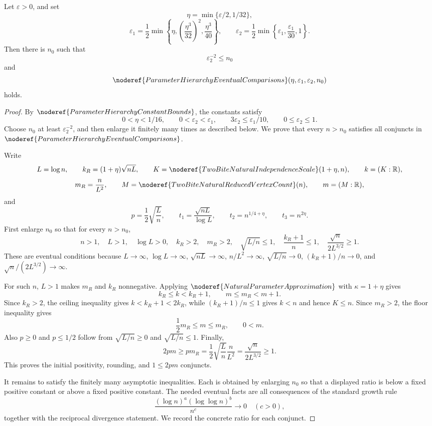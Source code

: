 \begin{lemma}
Let \(\varepsilon>0\), and set
\[
\eta=\min\{\varepsilon/2,1/32\},
\]
\[
\varepsilon_1=
\frac12\min\left\{
\eta,\left(\frac{\eta^3}{32}\right)^2,\frac{\eta^3}{40}
\right\},
\qquad
\varepsilon_2=\frac12\min\left\{\varepsilon_1,\frac{\varepsilon_1}{30},1\right\}.
\]
Then there is \(n_0\) such that
\[
\varepsilon_2^{-2}\le n_0
\]
and
\[
\noderef{ParameterHierarchyEventualComparisons}(\eta,\varepsilon_1,
\varepsilon_2,n_0)
\]
holds.
\end{lemma}
\begin{proof}
By \(\noderef{ParameterHierarchyConstantBounds}\), the constants satisfy
\[
0<\eta<1/16,\qquad 0<\varepsilon_2<\varepsilon_1,\qquad
3\varepsilon_2\le\varepsilon_1/10,\qquad 0\le\varepsilon_2\le1.
\]
Choose \(n_0\) at least \(\varepsilon_2^{-2}\), and then enlarge it finitely
many times as described below.  We prove that every \(n>n_0\) satisfies all
conjuncts in \(\noderef{ParameterHierarchyEventualComparisons}\).

Write
\[
L=\log n,\qquad
k_R=(1+\eta)\sqrt{nL},\qquad
K=\noderef{TwoBiteNaturalIndependenceScale}(1+\eta,n),\qquad
k=(K:\mathbb R),
\]
\[
m_R=\frac{n}{L^2},\qquad
M=\noderef{TwoBiteNaturalReducedVertexCount}(n),\qquad
m=(M:\mathbb R),
\]
and
\[
p=\frac12\sqrt{\frac Ln},\qquad
t_1=\frac{\sqrt{nL}}{\log L},\qquad
t_2=n^{1/4+\eta},\qquad
t_3=n^{2\eta}.
\]
First enlarge \(n_0\) so that for every \(n>n_0\),
\[
n>1,\quad L>1,\quad \log L>0,\quad k_R>2,\quad m_R>2,\quad
\sqrt{L/n}\le1,\quad \frac{k_R+1}{n}\le1,\quad
\frac{\sqrt n}{2L^{3/2}}\ge1.
\]
These are eventual conditions because \(L\to\infty\), \(\log L\to\infty\),
\(\sqrt{nL}\to\infty\), \(n/L^2\to\infty\), \(\sqrt{L/n}\to0\),
\((k_R+1)/n\to0\), and \(\sqrt n/(2L^{3/2})\to\infty\).

For such \(n\), \(L>1\) makes \(m_R\) and \(k_R\) nonnegative.  Applying
\(\noderef{NaturalParameterApproximation}\) with \(\kappa=1+\eta\) gives
\[
k_R\le k<k_R+1,\qquad m\le m_R<m+1.
\]
Since \(k_R>2\), the ceiling inequality gives \(k<k_R+1<2k_R\), while
\((k_R+1)/n\le1\) gives \(k<n\) and hence \(K\le n\).  Since \(m_R>2\), the
floor inequality gives
\[
\frac12m_R\le m\le m_R,\qquad 0<m.
\]
Also \(p\ge0\) and \(p\le1/2\) follow from \(\sqrt{L/n}\ge0\) and
\(\sqrt{L/n}\le1\).  Finally,
\[
2pm\ge p m_R
=\frac12\sqrt{\frac Ln}\frac{n}{L^2}
=\frac{\sqrt n}{2L^{3/2}}\ge1.
\]
This proves the initial positivity, rounding, and \(1\le2pm\) conjuncts.

It remains to satisfy the finitely many asymptotic inequalities.  Each is
obtained by enlarging \(n_0\) so that a displayed ratio is below a fixed
positive constant or above a fixed positive constant.  The needed eventual
facts are all consequences of the standard growth rule
\[
\frac{(\log n)^a(\log\log n)^b}{n^c}\to0\quad(c>0),
\]
together with the reciprocal divergence statement.  We record the concrete
ratio for each conjunct.


\end{proof}
